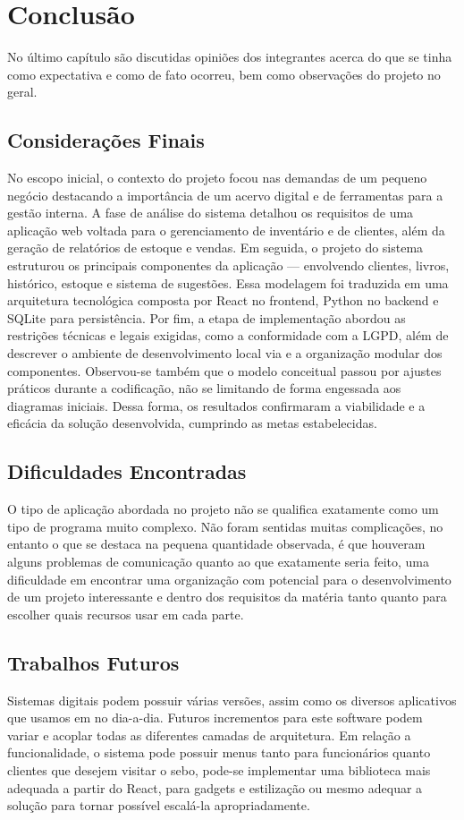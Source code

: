 \chapter{Conclusão}

No último capítulo são discutidas opiniões dos integrantes acerca do que se tinha como expectativa e como de fato ocorreu, bem como observações do projeto no geral.

\section{Considerações Finais}
No escopo inicial, o contexto do projeto focou nas demandas de um pequeno negócio destacando a importância de um acervo digital e de ferramentas para a gestão interna. A fase de análise do sistema detalhou os requisitos de uma aplicação web voltada para o gerenciamento de inventário e de clientes, além da geração de relatórios de estoque e vendas.
Em seguida, o projeto do sistema estruturou os principais componentes da aplicação — envolvendo clientes, livros, histórico, estoque e sistema de sugestões. Essa modelagem foi traduzida em uma arquitetura tecnológica composta por React no frontend, Python no backend e SQLite para persistência.
Por fim, a etapa de implementação abordou as restrições técnicas e legais exigidas, como a conformidade com a LGPD, além de descrever o ambiente de desenvolvimento local via e a organização modular dos componentes. Observou-se também que o modelo conceitual passou por ajustes práticos durante a codificação, não se limitando de forma engessada aos diagramas iniciais. Dessa forma, os resultados confirmaram a viabilidade e a eficácia da solução desenvolvida, cumprindo as metas estabelecidas.

\section{Dificuldades Encontradas}
O tipo de aplicação abordada no projeto não se qualifica exatamente como um tipo de programa muito complexo. Não foram sentidas muitas complicações, no entanto o que se destaca na pequena quantidade observada, é que houveram alguns problemas de comunicação quanto ao que exatamente seria feito, uma dificuldade em encontrar uma organização com potencial para o desenvolvimento de um projeto interessante e dentro dos requisitos da matéria tanto quanto para escolher quais recursos usar em cada parte.

\section{Trabalhos Futuros}
Sistemas digitais podem possuir várias versões, assim como os diversos aplicativos que usamos em no dia-a-dia. Futuros incrementos para este software podem variar e acoplar todas as diferentes camadas de arquitetura. Em relação a funcionalidade, o sistema pode possuir menus tanto para funcionários quanto clientes que desejem visitar o sebo, pode-se implementar uma biblioteca mais adequada a partir do React, para gadgets e estilização ou mesmo adequar a solução para tornar possível escalá-la apropriadamente.